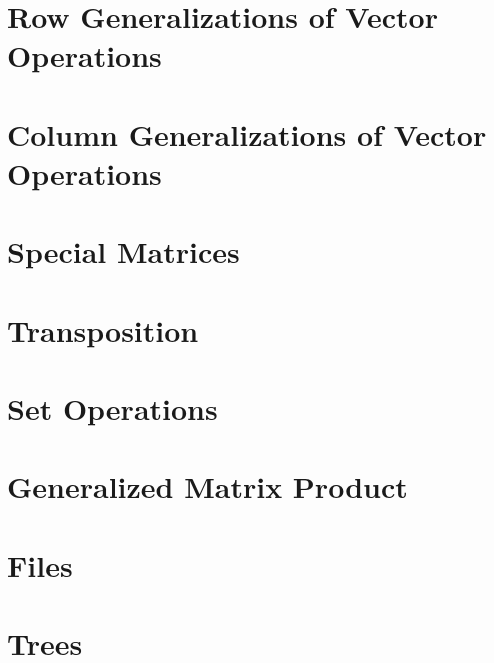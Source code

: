 \section{Row Generalizations of Vector Operations}


\section{Column Generalizations of Vector Operations}


\section{Special Matrices}


\section{Transposition}


\section{Set Operations}


\section{Generalized Matrix Product}


\section{Files}


\section{Trees}

